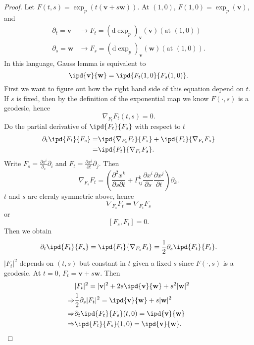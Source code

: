 \begin{proof}
  Let $F(t,s)=\exp_p\left( t\left( \mathbf{v}+s\mathbf{w} \right)  \right) $. At $(1,0)$, $F(1,0)=\exp_p\left( \mathbf{v} \right) $, and 
  \begin{align*}
    \partial_t=\mathbf{v}&\to F_t = (\mathrm{d}\exp_p)_{\mathbf{v}}(\mathbf{v}) \left( \text{at } (1,0) \right) \\
    \partial_s=\mathbf{w}&\to F_s = \left( \mathrm{d}\exp_p \right) _{\mathbf{v}}(\mathbf{w})\left( \text{at }(1,0) \right)  
  .\end{align*}
  In this language, Gauss lemma is equivalent to 
  \begin{equation}
    \ipd{\mathbf{v}}{\mathbf{w}}=\ipd{F_t(1,0}{F_s(1,0)}.
  \end{equation}
  First we want to figure out how the right hand side of this equation depend on $t$. If $s$ is fixed, then by the definition of the exponential map we know $F(\cdot ,s)$ is a geodesic, hence
  \begin{equation*}
    \nabla _{F_t}F_t(t,s)=0.
  \end{equation*}
  Do the partial derivative of $\ipd{F_t}{F_s}$ with respect to $t$
  \begin{align*}
    \partial_t\ipd{F_t}{F_s}=& \ipd{\nabla _{F_t}F_t}{F_s}+\ipd{F_t}{\nabla _{F_t}F_s}\\
    =& \ipd{F_t}{\nabla _{F_t}F_s}
  .\end{align*}
  Write $F_s=\frac{\partial x^i}{\partial_s}\partial_{i}$ and $F_t= \frac{\partial x^j}{\partial t}\partial_j$. Then 
  \[
    \nabla _{F_s}F_t= \left( \frac{\partial^2 x^k}{\partial s\partial t}+\Gamma^k_{ij} \frac{\partial x^i}{\partial s} \frac{\partial x^j}{\partial t} \right) \partial_{k}.
  \] 
  $t$ and $s$ are cleraly symmetric above, hence 
   \[
  \nabla _{F_s}F_t=\nabla _{F_t}F_s
  \] 
  or 
  \[
    [F_s,F_t]=0.
  \] 
  Then we obtain
  \begin{equation*}
    \partial_t\ipd{F_t}{F_s}=\ipd{F_t}{\nabla_{F_s} F_t}= \frac{1}{2}\partial_s \ipd{F_t}{F_t}.
  \end{equation*}
  $|F_t|^2$ depends on $(t,s)$ but constant in $t$ given a fixed $s$ since $F\left( \cdot ,s \right) $ is a geodesic. At $t=0$, $F_t=\mathbf{v}+s\mathbf{w}$. Then 
  \begin{align*}
    & |F_t|^2=|\mathbf{v}|^2+2s \ipd{\mathbf{v}}{\mathbf{w}}+s^2|\mathbf{w}|^2\\
    \Rightarrow & \frac{1}{2}\partial_s |F_t|^2=\ipd{\mathbf{v}}{\mathbf{w}}+s|\mathbf{w}|^2\\
    \Rightarrow & \partial_t \ipd{F_t}{F_s}(t,0)=\ipd{\mathbf{v}}{\mathbf{w}}\\
    \Rightarrow & \ipd{F_t}{F_s}(1,0)=\ipd{\mathbf{v}}{\mathbf{w}}
  .\end{align*}
\end{proof}

